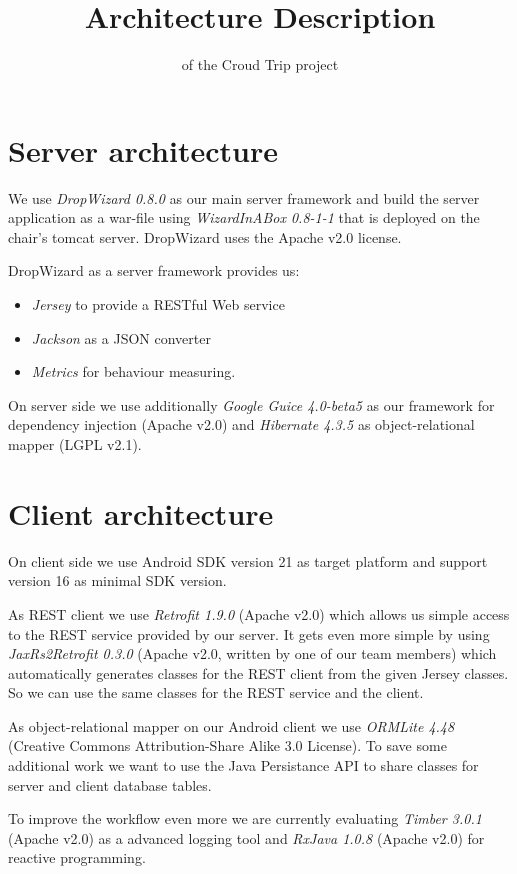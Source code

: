 \documentclass[ngerman, 10pt, a4paper]{scrartcl}
\title{ Architecture Description\huge \vspace{1pt} }
\author{ of the Croud Trip project\\ }
\makeatletter
\def\printtitle{ {\color{bl} \centering \huge \sc \textbf{\@title}\par}}
\def\printauthor{{\color{bl} \centering \small \@author}}
\makeatother
\begin{document}
\clearpage
\printtitle
\printauthor 

\section{Server architecture}
We use \emph{DropWizard 0.8.0} \cite{DropWizard} as our main server framework and build the server application as a war-file using \emph{WizardInABox 0.8-1-1} \cite{WizardInABox}  that is deployed on the chair's tomcat server. DropWizard uses the Apache v2.0 license.

DropWizard as a server framework provides us:
\begin{itemize}
\item \emph{Jersey} to provide a RESTful Web service
\item \emph{Jackson} as a JSON converter
\item \emph{Metrics} for behaviour measuring.
\end{itemize} 
On server side we use additionally \emph{Google Guice 4.0-beta5} \cite{GGuice} as our framework for dependency injection (Apache v2.0) and \emph{Hibernate 4.3.5} \cite{Hibernate} as object-relational mapper (LGPL v2.1).

\section{Client architecture}
On client side we use Android SDK version 21 as target platform and support version 16 as minimal SDK version.

As REST client we use \emph{Retrofit 1.9.0} \cite{Retrofit} (Apache v2.0) which allows us simple access to the REST service provided by our server. It gets even more simple by using \emph{JaxRs2Retrofit 0.3.0} \cite{JRR} (Apache v2.0, written by one of our team members) which automatically generates classes for the REST client from the given Jersey classes. So we can use the same classes for the REST service and the client.

As object-relational mapper on our Android client we use \emph{ORMLite 4.48} \cite{ORMLite} (Creative Commons Attribution-Share Alike 3.0 License). To save some additional work we want to use the Java Persistance API to share classes for server and client database tables.

To improve the workflow even more we are currently evaluating \emph{Timber 3.0.1} \cite{Timber} (Apache v2.0) as a advanced logging tool and \emph{RxJava 1.0.8} \cite{RxJava} (Apache v2.0) for reactive programming.
\end{document}
